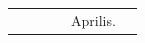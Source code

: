 \documentclass[openany]{book}
\renewcommand{\\}{\par\hspace*{.1em}} %
\begin{document}
\begin{center}
\begin{tabular}{l | l | l | r | l l}
& & & & \color{Red} Aprilis. \\

\end{tabular}
\end{center}
\end{document}
